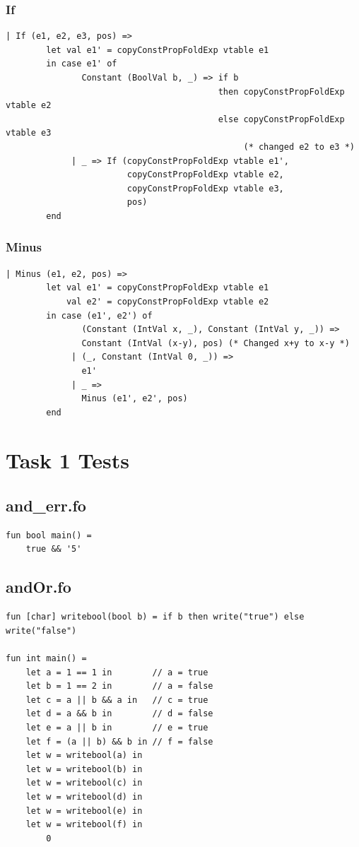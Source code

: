 \documentclass[11pt]{article}
\begin{document}
	\subsubsection{If}
	\begin{lstlisting}[basicstyle=\small]
      | If (e1, e2, e3, pos) =>
        let val e1' = copyConstPropFoldExp vtable e1
        in case e1' of
               Constant (BoolVal b, _) => if b
                                          then copyConstPropFoldExp vtable e2
                                          else copyConstPropFoldExp vtable e3
                                               (* changed e2 to e3 *)
             | _ => If (copyConstPropFoldExp vtable e1',
                        copyConstPropFoldExp vtable e2,
                        copyConstPropFoldExp vtable e3,
                        pos)
        end
    \end{lstlisting}
    
   	\subsubsection{Minus} \label{ccpfvar}
	\begin{lstlisting}[basicstyle=\small]
      | Minus (e1, e2, pos) =>
        let val e1' = copyConstPropFoldExp vtable e1
            val e2' = copyConstPropFoldExp vtable e2
        in case (e1', e2') of
               (Constant (IntVal x, _), Constant (IntVal y, _)) =>
               Constant (IntVal (x-y), pos) (* Changed x+y to x-y *)
             | (_, Constant (IntVal 0, _)) =>
               e1'
             | _ =>
               Minus (e1', e2', pos)
        end
    \end{lstlisting}
    
    \newpage
    \section{Task 1 Tests} \label{task_1_tests}
    \subsection{and\_err.fo}
    \begin{lstlisting}[basicstyle=\small]
fun bool main() =
    true && '5'
    \end{lstlisting}

    \subsection{andOr.fo}
    \begin{lstlisting}[basicstyle=\small]
fun [char] writebool(bool b) = if b then write("true") else write("false")

fun int main() =
    let a = 1 == 1 in        // a = true
    let b = 1 == 2 in        // a = false
    let c = a || b && a in   // c = true
    let d = a && b in        // d = false
    let e = a || b in        // e = true
    let f = (a || b) && b in // f = false
    let w = writebool(a) in
    let w = writebool(b) in
    let w = writebool(c) in
    let w = writebool(d) in
    let w = writebool(e) in
    let w = writebool(f) in
        0
    \end{lstlisting}
\end{document}
